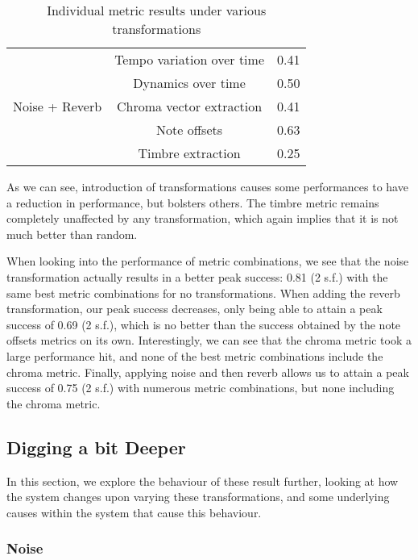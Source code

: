 \documentclass[oneside, class=book, 12pt, crop=false]{standalone}
\begin{document}
\begin{table}[h]
\begin{tabular}{c|cc}
        \multirow{5}{*}{Noise + Reverb} & Tempo variation over time & 0.41 \\ \cline{2-3}
                                &Dynamics over time & 0.50 \\ \cline{2-3}
                                &Chroma vector extraction & 0.41 \\ \cline{2-3}
                                &Note offsets &  0.63\\ \cline{2-3}
                                &Timbre extraction & 0.25 \\ 
        
    \end{tabular}
    \caption{Individual metric results under various transformations}
    \label{table:transformation results}
\end{table}



As we can see, introduction of transformations causes some performances to have a reduction in performance, but bolsters others. The timbre metric remains completely unaffected by any transformation, which again implies that it is not much better than random.

When looking into the performance of metric combinations, we see that the noise transformation actually results in a better peak success: 0.81 (2 s.f.) with the same best metric combinations for no transformations. When adding the reverb transformation, our peak success decreases, only being able to attain a peak success of 0.69 (2 s.f.), which is no better than the success obtained by the note offsets metrics on its own. Interestingly, we can see that the chroma metric took a large performance hit, and none of the best metric combinations include the chroma metric. Finally, applying noise and then reverb allows us to attain a peak success of 0.75 (2 s.f.) with numerous metric combinations, but none including the chroma metric.

\subsection{Digging a bit Deeper}

In this section, we explore the behaviour of these result further, looking at how the system changes upon varying these transformations, and some underlying causes within the system that cause this behaviour.

\subsubsection{Noise}
\end{document}
